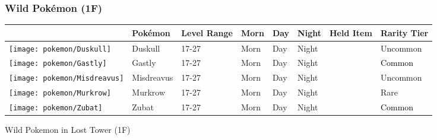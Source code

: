 \subsubsection{Wild Pokémon (1F)}%
\label{ssubsec:WildPokmon(1F)}%
\begin{longtable}{||l l l l l l l l||}%
\hline%
\rowcolor{gray}%
&Pokémon&Level Range&Morn&Day&Night&Held Item&Rarity Tier\\%
\hline%
\endhead%
\hline%
\rowcolor{gray}%
\texttt{[image: pokemon/Duskull]}&Duskull&17{-}27&Morn&Day&Night&&\textcolor{OliveGreen}{%
Uncommon%
}\\%
\hline%
\rowcolor{gray}%
\texttt{[image: pokemon/Gastly]}&Gastly&17{-}27&Morn&Day&Night&&\textcolor{black}{%
Common%
}\\%
\hline%
\rowcolor{gray}%
\texttt{[image: pokemon/Misdreavus]}&Misdreavus&17{-}27&Morn&Day&Night&&\textcolor{OliveGreen}{%
Uncommon%
}\\%
\hline%
\rowcolor{gray}%
\texttt{[image: pokemon/Murkrow]}&Murkrow&17{-}27&Morn&Day&Night&&\textcolor{RedOrange}{%
Rare%
}\\%
\hline%
\rowcolor{gray}%
\texttt{[image: pokemon/Zubat]}&Zubat&17{-}27&Morn&Day&Night&&\textcolor{black}{%
Common%
}\\%
\hline%
\end{longtable}%
\caption{Wild Pokemon in Lost Tower (1F)}